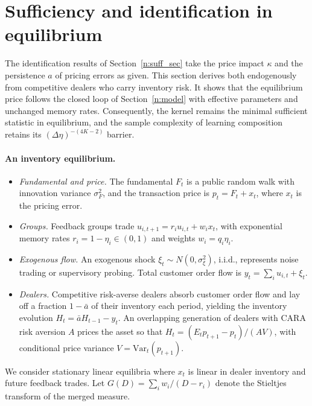 \documentclass[12pt]{article}
\theoremstyle{definition}
\theoremstyle{remark}
\begin{document}
\section{Sufficiency and identification in equilibrium}\label{n:sec_equilibrium}

The identification results of Section~\ref{n:suff_sec} take the price impact $\kappa$ and the persistence $a$ of pricing errors as given. This section derives both endogenously from competitive dealers who carry inventory risk. It shows that the equilibrium price follows the closed loop of Section~\ref{n:model} with effective parameters and unchanged memory rates. Consequently, the kernel remains the minimal sufficient statistic in equilibrium, and the sample complexity of learning composition retains its $(\Delta\eta)^{-(4K-2)}$ barrier.

\paragraph{An inventory equilibrium.}
\begin{itemize}[itemsep=1pt,topsep=2pt]
\item \emph{Fundamental and price.} The fundamental $F_t$ is a public random walk with innovation variance $\sigma_F^2$, and the transaction price is $p_t=F_t+x_t$, where $x_t$ is the pricing error.
\item \emph{Groups.} Feedback groups trade $u_{i,t+1}=r_i u_{i,t}+w_i x_t$, with exponential memory rates $r_i=1-\eta_i\in(0,1)$ and weights $w_i=q_i\eta_i$.
\item \emph{Exogenous flow.} An exogenous shock $\xi_t\sim N(0,\sigma_\xi^2)$, i.i.d., represents noise trading or supervisory probing. Total customer order flow is $y_t=\sum_i u_{i,t}+\xi_t$.
\item \emph{Dealers.} Competitive risk-averse dealers absorb customer order flow and lay off a fraction $1-\bar a$ of their inventory each period, yielding the inventory evolution $H_t=\bar a H_{t-1}-y_t$. An overlapping generation of dealers with CARA risk aversion $A$ prices the asset so that $H_t=(E_t p_{t+1}-p_t)/(A V)$, with conditional price variance $V=\mathrm{Var}_t(p_{t+1})$.
\end{itemize}
We consider stationary linear equilibria where $x_t$ is linear in dealer inventory and future feedback trades. Let $G(D)=\sum_i w_i/(D-r_i)$ denote the Stieltjes transform of the merged measure.
\end{document}
